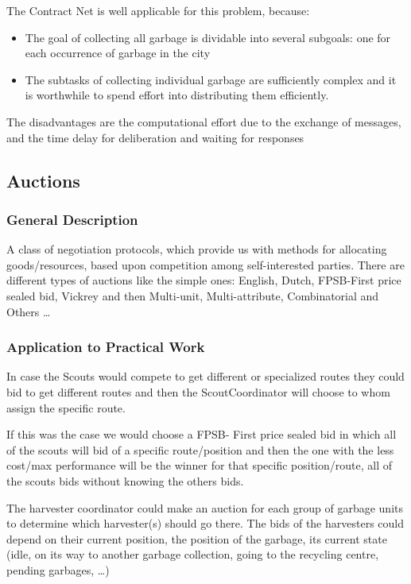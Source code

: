 The Contract Net is well applicable for this problem, because:

\begin{itemize}
	\item The goal of collecting all garbage is dividable into several subgoals: one for each occurrence of garbage in the city
	\item The subtasks of collecting individual garbage are sufficiently complex and it is worthwhile to spend effort into distributing them efficiently. 
\end{itemize}

The disadvantages are the computational effort due to the exchange of messages, and the time delay for deliberation and waiting for responses

\subsection{Auctions}

\subsubsection{General Description}

A class of negotiation protocols, which provide us with methods for allocating goods/resources, based upon competition among self-interested parties.
There are different types of auctions like the simple ones: English, Dutch, FPSB-First price sealed bid, Vickrey and then Multi-unit, Multi-attribute, Combinatorial and Others …

\subsubsection{Application to Practical Work}

In case the Scouts would compete to get different or specialized routes they could bid to get different routes and then the ScoutCoordinator will choose to whom assign the specific route.

If this was the case we would choose a FPSB- First price sealed bid in which all of the scouts will bid of a specific route/position and then the one with the less cost/max performance will be the winner for that specific position/route, all of the scouts bids without knowing the others bids.

The harvester coordinator could make an auction for each group of garbage units to determine which harvester(s) should go there. The bids of the harvesters could depend on their current position, the position of the garbage, its current state (idle, on its way to another garbage collection, going to the recycling centre, pending garbages, …)

